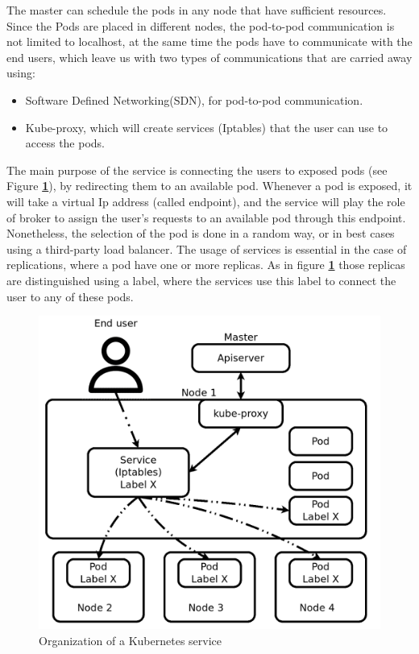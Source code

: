 \documentclass[letterpaper,twocolumn,10pt]{article}
\let\origref\ref
\def\ref#1{\textbf{\origref{#1}}}
\begin{document}
The master can schedule the pods in any node that have sufficient
resources. Since the Pods are placed in different nodes, the
pod-to-pod communication is not limited to localhost, at the same time
the pods have to communicate with the end users, which leave us with
two types of communications that are carried away using:

\begin{itemize}
	\item Software Defined Networking(SDN), for pod-to-pod communication.
	\item Kube-proxy, which will create services (Iptables) that the user can use to access the pods. 
\end{itemize}

The main purpose of the service is connecting the users to exposed
pods (see Figure \ref{fig:svc}), by redirecting them to an available
pod. Whenever a pod is exposed, it will take a virtual Ip address
(called endpoint), and the service will play the role of broker to
assign the user's requests to an available pod through this
endpoint. Nonetheless, the selection of the pod is done in a random
way, or in best cases using a third-party load balancer. The usage of
services is essential in the case of replications, where a pod have
one or more replicas. As in figure \ref{fig:svc} those replicas are
distinguished using a label, where the services use this label to
connect the user to any of these pods.

\begin{figure}[t]
  \centering
  \includegraphics[width=.9\linewidth]{images/svc.png}
  \caption{Organization of a Kubernetes service}
  \label{fig:svc}
\end{figure}
\end{document}
